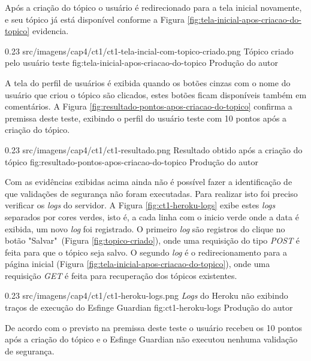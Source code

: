 \par Após a criação do tópico o usuário é redirecionado para a tela inicial novamente, e seu tópico já está disponível conforme a Figura \ref{fig:tela-inicial-apos-criacao-do-topico} evidencia.

\begin{image}
{0.23}
{src/imagens/cap4/ct1/ct1-tela-incial-com-topico-criado.png}
{Tópico criado pelo usuário teste}
{fig:tela-inicial-apos-criacao-do-topico}
{Produção do autor}
\end{image}

\par A tela do perfil de usuários é exibida quando os botões cinzas com o nome do usuário que criou o tópico são clicados, estes botões ficam disponíveis também em comentários. A Figura \ref{fig:resultado-pontos-apos-criacao-do-topico} confirma a premissa deste teste, exibindo o perfil do usuário teste com 10 pontos após a criação do tópico.

\begin{image}
{0.23}
{src/imagens/cap4/ct1/ct1-resultado.png}
{Resultado obtido após a criação do tópico}
{fig:resultado-pontos-apos-criacao-do-topico}
{Produção do autor}
\end{image}

\par Com as evidências exibidas acima ainda não é possível fazer a identificação de que validações de segurança não foram executadas. Para realizar isto foi preciso verificar os \textit{logs} do servidor. A Figura \ref{fig:ct1-heroku-logs} exibe estes \textit{logs} separados por cores verdes, isto é, a cada linha com o inicio verde onde a data é exibida, um novo \textit{log} foi registrado. O primeiro \textit{log} são registros do clique no botão "Salvar"\ (Figura \ref{fig:topico-criado}), onde uma requisição do tipo \textit{POST} é feita para que o tópico seja salvo. O segundo \textit{log} é o redirecionamento para a página inicial (Figura \ref{fig:tela-inicial-apos-criacao-do-topico}), onde uma requisição \textit{GET} é feita para recuperação dos tópicos existentes.

\begin{image}
{0.23}
{src/imagens/cap4/ct1/ct1-heroku-logs.png}
{\textit{Logs} do Heroku não exibindo traços de execução do Esfinge Guardian}
{fig:ct1-heroku-logs}
{Produção do autor}
\end{image}

\par De acordo com o previsto na premissa deste teste o usuário recebeu os 10 pontos após a criação do tópico e o Esfinge Guardian não executou nenhuma validação de segurança.

